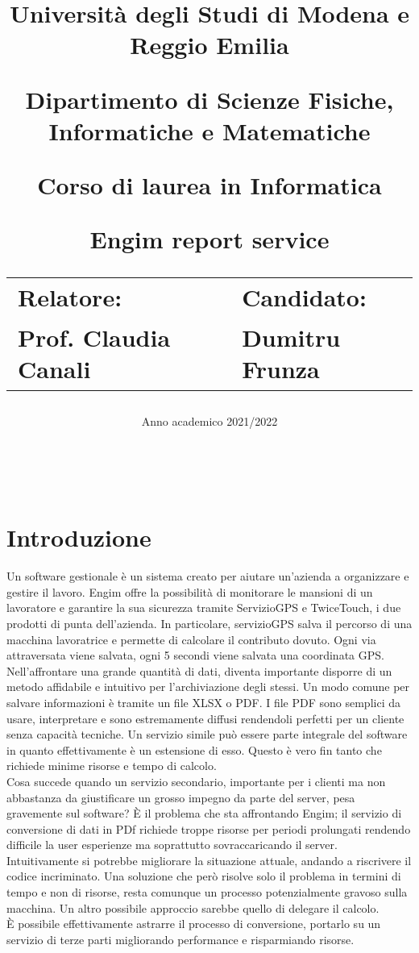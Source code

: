 \documentclass[12pt]{article}
\author{}
\title{
    \huge 
        \textbf{Università degli Studi di Modena e Reggio Emilia}
    \large
        \par Dipartimento di Scienze Fisiche, Informatiche e Matematiche
        \par Corso di laurea in Informatica
    \vfil
        \huge \par \textbf{Engim report service}
    \vfil
    \normalsize
    \begin{tabular}{lp{0.4\textwidth}l}
      Relatore: & & Candidato: \\
      Prof. Claudia Canali & &  Dumitru Frunza \\
      \end{tabular}
}
\date{Anno academico 2021/2022}
\begin{document}
\maketitle
\thispagestyle{empty}
\newpage 
\thispagestyle{empty}
\
\newpage
{}
\addtocounter{page}{0}
\listoffigures
\newpage
{}
\tableofcontents
{}
\newpage
{}
\addtocounter{page}{0}


\section*{Introduzione}
Un software gestionale è un sistema creato per aiutare un'azienda a organizzare 
e gestire il lavoro.
Engim offre la possibilità di monitorare le mansioni di un lavoratore e garantire 
la sua sicurezza tramite ServizioGPS e TwiceTouch, i due prodotti di punta dell'azienda. 
In particolare, servizioGPS salva il percorso di una macchina lavoratrice e 
permette di calcolare il contributo dovuto. Ogni via attraversata viene salvata, 
ogni 5 secondi viene salvata una coordinata GPS.
\\ Nell'affrontare una grande quantità di dati, diventa importante
 disporre di un metodo affidabile e intuitivo per l'archiviazione degli stessi.
Un modo comune per salvare informazioni è tramite un file XLSX o PDF.
I file PDF sono semplici da usare, interpretare e sono estremamente diffusi 
rendendoli perfetti per un cliente senza capacità tecniche. 
Un servizio simile può essere parte integrale del software in quanto effettivamente 
è un estensione di esso.
Questo è vero fin tanto che richiede minime risorse e tempo di calcolo.
\\ Cosa succede quando un servizio secondario, importante per i clienti ma non 
abbastanza da giustificare un grosso impegno da parte del server, pesa gravemente 
sul software? 
È il problema che sta affrontando Engim; il servizio di conversione di dati 
in PDf richiede troppe risorse per periodi prolungati rendendo difficile la user 
esperienze ma soprattutto sovraccaricando il server.
Intuitivamente si potrebbe migliorare la situazione attuale, andando a riscrivere 
il codice incriminato.
Una soluzione che però risolve solo il problema in termini di tempo e non di 
risorse, resta comunque un processo potenzialmente gravoso sulla macchina. 
Un altro possibile approccio sarebbe quello di delegare il calcolo.
\\ È possibile effettivamente astrarre il processo di conversione, portarlo su 
un servizio di terze parti migliorando performance e risparmiando risorse.
\end{document}
